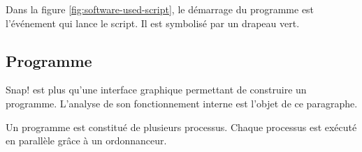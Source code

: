 Dans la figure \ref{fig:software-used-script}, le démarrage du programme est l'événement qui lance le script. Il est symbolisé par un drapeau vert.

\subsection{Programme}
Snap! est plus qu'une interface graphique permettant de construire un programme. L'analyse de son fonctionnement interne est l'objet de ce paragraphe.

Un programme est constitué de plusieurs processus. Chaque processus est exécuté en parallèle grâce à un ordonnanceur.

% 
% 
% 
% 
% 

